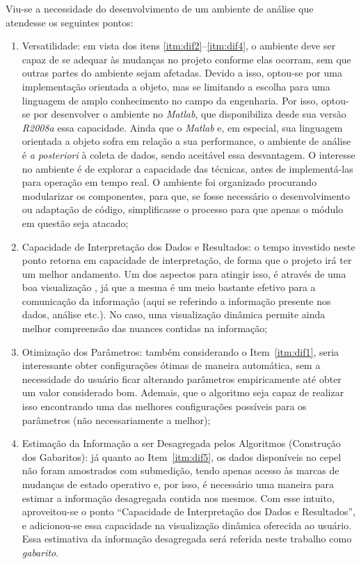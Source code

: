 Viu-se a necessidade do
desenvolvimento de um ambiente de análise que atendesse os seguintes
pontos:

\begin{enumerate}
\item Versatilidade: em vista dos itens
\ref{itm:dif2}--\ref{itm:dif4}, o ambiente deve ser capaz de se
adequar às mudanças no projeto conforme elas ocorram, sem que outras
partes do ambiente sejam afetadas. Devido a isso, optou-se por uma
implementação orientada a objeto, mas se limitando a escolha para uma
linguagem de amplo conhecimento no campo da engenharia. Por isso,
optou-se por desenvolver o ambiente no \emph{Matlab}, que
disponibiliza desde sua versão \emph{R2008a} essa capacidade.
Ainda que o \emph{Matlab} e, em especial, sua linguagem orientada a
objeto sofra em relação a sua performance, o ambiente de análise é
\emph{a posteriori} à coleta de dados, sendo aceitável essa
desvantagem. O interesse no ambiente é de explorar a capacidade das
técnicas, antes de implementá-las para operação em tempo real. O ambiente
foi organizado procurando modularizar os componentes, para que, se
fosse necessário o desenvolvimento ou adaptação de código,
simplificasse o processo para que apenas o módulo em questão seja
atacado;

\item Capacidade de Interpretação dos Dados e Resultados: o tempo
investido neste ponto retorna em capacidade de interpretação, de forma
que o projeto irá ter um melhor andamento. Um dos aspectos para
atingir isso, é através de uma boa visualização \cite{it_depends}, já
que a mesma é um meio bastante efetivo para a comunicação da
informação (aqui se referindo a informação presente nos dados,
análise etc.). No caso, uma visualização dinâmica permite ainda melhor
compreensão das nuances contidas na informação;

\item Otimização dos Parâmetros: também considerando o
Item~\ref{itm:dif1}, seria interessante obter configurações ótimas de
maneira automática, sem a necessidade do usuário ficar alterando
parâmetros empiricamente até obter um valor considerado bom.
Ademais, que o algoritmo seja capaz de realizar isso encontrando uma
das melhores configurações possíveis para os parâmetros (não
necessariamente a melhor);

\item Estimação da Informação a ser Desagregada pelos Algoritmos
(Construção dos Gabaritos): já
quanto ao Item~\ref{itm:dif5}, os dados disponíveis no \acs{cepel} não
foram amostrados com submedição, tendo apenas acesso às marcas de
mudanças de estado operativo e, por isso, é necessário uma maneira para
estimar a informação desagregada contida nos mesmos. Com esse intuito,
aproveitou-se o ponto ``Capacidade de Interpretação dos Dados e
Resultados'', e adicionou-se essa capacidade na
visualização dinâmica oferecida ao usuário. Essa estimativa da
informação desagregada será referida neste trabalho como
\emph{gabarito}.

\end{enumerate}

